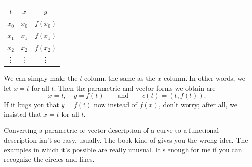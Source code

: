 \documentclass[11pt]{amsart}
\begin{document}
\begin{center}
\begin{tabular}{c||c|c}
	$t$ & $x$  & $y$ \\ \hline
	$x_0$ & $x_0$ & $f(x_0)$ \\
	$x_1$ & $x_1$ & $f(x_1)$ \\
	$x_2$ & $x_2$ & $f(x_2)$ \\
	\vdots & \vdots & \vdots
\end{tabular}
\end{center}

We can simply make the $t$-column the same as the $x$-column. In other words, we let $x = t$ for all $t$. Then the parametric and vector forms we obtain are
\[
	x = t, \quad y = f(t) \qquad \text{and} \qquad c(t) = (t, f(t)).
\]
If it bugs you that $y = f(t)$ now instead of $f(x)$, don't worry; after all, we insisted that $x = t$ for all $t$.

Converting a parametric or vector description of a curve to a functional description isn't so easy, usually. The book kind of gives you the wrong idea. The examples in which it's possible are really unusual. It's enough for me if you can recognize the circles and lines. 
\end{document}
